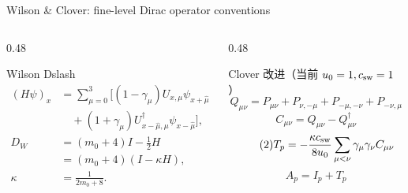 \documentclass[UTF8,aspectratio=169,11pt,fontset=none]{ctexbeamer}
\begin{document}
\begin{frame}[t]{Wilson \& Clover: fine-level Dirac operator conventions}
\begin{columns}[T,totalwidth=\textwidth]
\begin{column}{0.48\textwidth}
  \begin{block}{Wilson Dslash}
  \footnotesize
  \begin{equation}\tag{1}
  \begin{aligned}
  (H\psi)_x
  &=\sum_{\mu=0}^{3}\Big[
  (1-\gamma_\mu)U_{x,\mu}\psi_{x+\hat\mu}\\
  &\quad +(1+\gamma_\mu)U^\dagger_{x-\hat\mu,\mu}\psi_{x-\hat\mu}\Big],\\
  D_W&=(m_0+4)I-\frac12H\\
  &=(m_0+4)(I-\kappa H),\\
  \kappa&=\frac{1}{2m_0+8}.
  \end{aligned}
  \end{equation}
  \end{block}
\end{column}
\begin{column}{0.48\textwidth}
  \begin{block}{Clover 改进（当前 \(u_0=1,c_{\rm sw}=1\)）}
  \small
  \[
  Q_{\mu\nu}=P_{\mu\nu}+P_{\nu,-\mu}
  +P_{-\mu,-\nu}+P_{-\nu,\mu}
  \]
  \[
  C_{\mu\nu}=Q_{\mu\nu}-Q^\dagger_{\mu\nu}
  \]
  \begin{equation}\tag{2}
  T_p=-\frac{\kappa c_{\rm sw}}{8u_0}
  \sum_{\mu<\nu}\gamma_\mu\gamma_\nu C_{\mu\nu}
  \end{equation}
  \[
  A_p=I_p+T_p
  \]
  \end{block}
\end{column}
\end{columns}
\vspace{-0.45cm}
\end{frame}
\end{document}
